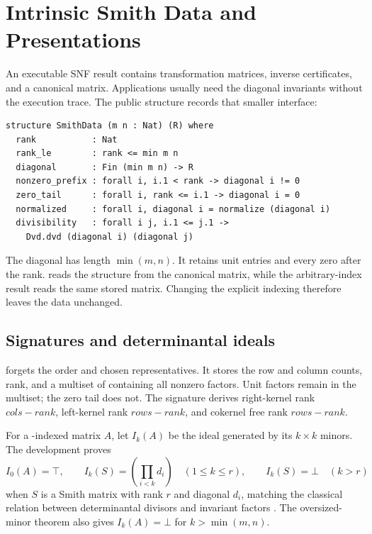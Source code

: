 \section{Intrinsic Smith Data and Presentations}
\label{sec:intrinsic-smith}

An executable SNF result contains transformation matrices, inverse
certificates, and a canonical matrix. Applications usually need the diagonal
invariants without the execution trace. The public structure
 records that smaller interface:

\begin{lstlisting}[style=leanstyle,caption={Ordered intrinsic Smith data.}]
structure SmithData (m n : Nat) (R) where
  rank           : Nat
  rank_le        : rank <= min m n
  diagonal       : Fin (min m n) -> R
  nonzero_prefix : forall i, i.1 < rank -> diagonal i != 0
  zero_tail      : forall i, rank <= i.1 -> diagonal i = 0
  normalized     : forall i, diagonal i = normalize (diagonal i)
  divisibility   : forall i j, i.1 <= j.1 ->
    Dvd.dvd (diagonal i) (diagonal j)
\end{lstlisting}

The diagonal has length \(\min(m,n)\). It retains unit entries and every zero
after the rank.  reads the structure from the
canonical matrix, while the arbitrary-index result reads the same stored
 matrix. Changing the explicit indexing therefore leaves the data
unchanged.

\subsection{Signatures and determinantal ideals}

 forgets the order and chosen representatives. It stores
the row and column counts, rank, and a multiset of 
containing all nonzero factors. Unit factors remain in the multiset; the zero
tail does not. The signature derives right-kernel rank
\(\mathit{cols}-\mathit{rank}\), left-kernel rank
\(\mathit{rows}-\mathit{rank}\), and cokernel free rank
\(\mathit{rows}-\mathit{rank}\).

For a -indexed matrix \(A\), let \(I_k(A)\) be the ideal generated by
its \(k\times k\) minors. The development proves
\[
 I_0(A)=\top,\qquad
 I_k(S)=\left(\prod_{i<k} d_i\right)
   \quad (1\leq k\leq r),\qquad
 I_k(S)=\bot\quad(k>r)
\]
when \(S\) is a Smith matrix with rank \(r\) and diagonal \(d_i\), matching the
classical relation between determinantal divisors and invariant factors
\citep[p. 81]{newman1971smith}. The
oversized-minor theorem also gives \(I_k(A)=\bot\) for
\(k>\min(m,n)\).


